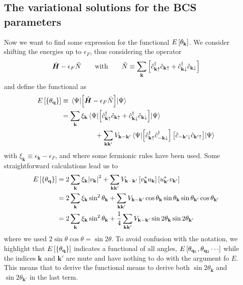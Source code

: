 \subsection{The variational solutions for the BCS parameters}\label{subsec:the variational solutions for the bcs parameters}

Now we want to find some expression for the functional $E\left[{\theta_\mathbf{k}}\right]$. We consider shifting the energies up to $\epsilon_F$, thus considering the operator
\[
	\hat{\bm H} - \epsilon_F \hat{N}
	\quad\qq{with}\quad
	\hat{N} \equiv \sum_{\mathbf{k}} \lrS{
		\hat{c}_{\mathbf{k}\uparrow}^\dagger \hat{c}_{\mathbf{k}\uparrow} + \hat{c}_{\mathbf{k}\downarrow}^\dagger \hat{c}_{\mathbf{k}\downarrow}
	}
\]
and define the functional as
\[
\begin{aligned}
	E\left[{\left\{{\theta_\mathbf{q}}\right\}}\right] &\equiv \mel{\Psi}{\left[{\hat{\bm H} - \epsilon_F \hat{N}}\right]}{\Psi} \\
	&= \sum_{\mathbf{k}} \xi_{\mathbf{k}} \mel{\Psi}{\left[{\hat{c}_{\mathbf{k}\uparrow}^\dagger \hat{c}_{\mathbf{k}\uparrow} + \hat{c}_{\mathbf{k}\downarrow}^\dagger \hat{c}_{\mathbf{k}\downarrow}}\right]}{\Psi} \\ 
	&\hspace{5em} + \sum_{\mathbf{k}\mathbf{k}'} V_{\mathbf{k}-\mathbf{k}'} \mel{\Psi}{\left[{\hat{c}_{\mathbf{k}\uparrow}^\dagger \hat{c}_{-\mathbf{k}\downarrow}^\dagger}\right] \left[{\vphantom{c^\dagger} \hat{c}_{-\mathbf{k}'\downarrow} \hat{c}_{\mathbf{k}'\uparrow}}\right]}{\Psi}
\end{aligned}
\]
with $\xi_{\mathbf{k}} \equiv \epsilon_{\mathbf{k}} - \epsilon_F$, and where some fermionic rules have been used. Some straightforward calculations lead us to
\[
\begin{aligned}
	E\left[{\left\{{\theta_\mathbf{q}}\right\}}\right] &= 2 \sum_{\mathbf{k}} \xi_{\mathbf{k}} \abs{v_\mathbf{k}}^2 + \sum_{\mathbf{k}\mathbf{k}'} V_{\mathbf{k}-\mathbf{k}'} \left[{v_\mathbf{k}^* u_\mathbf{k}}\right] \left[{u_{\mathbf{k}'}^* v_{\mathbf{k}'}}\right] \\
	&= 2 \sum_{\mathbf{k}} \xi_{\mathbf{k}} \sin^2\theta_\mathbf{k} + \sum_{\mathbf{k}\mathbf{k}'} V_{\mathbf{k}-\mathbf{k}'}
	\cos\theta_\mathbf{k} \sin\theta_\mathbf{k}
	\sin\theta_{\mathbf{k}'} \cos\theta_{\mathbf{k}'} \\
	&= 2 \sum_{\mathbf{k}} \xi_{\mathbf{k}} \sin^2\theta_\mathbf{k} + \frac{1}{4} \sum_{\mathbf{k}\mathbf{k}'} V_{\mathbf{k}-\mathbf{k}'}
	\sin2\theta_\mathbf{k} \sin2\theta_{\mathbf{k}'}
\end{aligned}
\]
where we used $2 \sin\theta\cos\theta = \sin2\theta$. To avoid confusion with the notation, we highlight that $E\left[{\left\{{\theta_\mathbf{q}}\right\}}\right]$ indicates a functional of all angles, $E\left[{\theta_{\mathbf{q}_1},\theta_{\mathbf{q}_2}\cdots}\right]$ while the indices $\mathbf{k}$ and $\mathbf{k}'$ are mute and have nothing to do with the argument fo $E$. This means that to derive the functional means to derive both $\sin2\theta_\mathbf{k}$ and $\sin2\theta_{\mathbf{k}'}$ in the last term.
